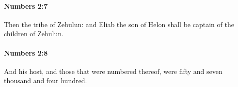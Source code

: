 		\paragraph{Numbers 2:7} %
			\label{NUMBERS-2-7}

			Then the tribe of Zebulun: and Eliab the son of Helon shall be captain of the children of Zebulun.


		\paragraph{Numbers 2:8} %
			\label{NUMBERS-2-8}

			And his host, and those that were numbered thereof, were fifty and seven thousand and four hundred.


